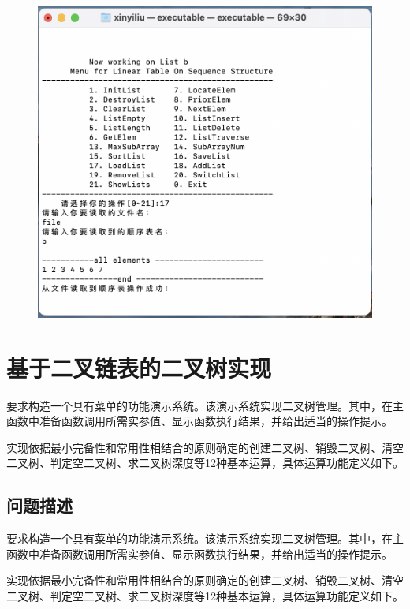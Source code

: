 \documentclass[supercite]{Experimental_Report}
\theoremstyle{definition}
\begin{document}
\begin{enumerate}
\begin{figure}[!htb]
	\end{figure}
	\begin{figure}[!htb]
		\includegraphics[width=0.8\linewidth]{images/截屏2023-06-01 22.20.01.png}
	\end{figure}
	\FloatBarrier
\end{enumerate}
\newpage
\section{基于二叉链表的二叉树实现}
要求构造一个具有菜单的功能演示系统。该演示系统实现二叉树管理。其中，在主函数中准备函数调用所需实参值、显示函数执行结果，并给出适当的操作提示。

实现依据最小完备性和常用性相结合的原则确定的创建二叉树、销毁二叉树、清空二叉树、判定空二叉树、求二叉树深度等12种基本运算，具体运算功能定义如下。

\subsection{问题描述}

要求构造一个具有菜单的功能演示系统。该演示系统实现二叉树管理。其中，在主函数中准备函数调用所需实参值、显示函数执行结果，并给出适当的操作提示。

实现依据最小完备性和常用性相结合的原则确定的创建二叉树、销毁二叉树、清空二叉树、判定空二叉树、求二叉树深度等12种基本运算，具体运算功能定义如下。
\end{document}
